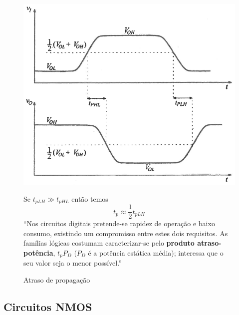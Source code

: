 \begin{figure}[H]
    \centering
    \begin{minipage}[t]{0.475\linewidth}\vspace{0pt}%
        \centering
        \includegraphics[width=1\linewidth]{img/5/propagation-delay.png}
        \caption{Atraso de propagação \cite{medeiros:CTBM}}
        \label{fig:propagation-delay}
    \end{minipage}\hfill%
    \begin{minipage}[t]{0.475\linewidth}\vspace{0pt}%
        Se $t_{pLH} \gg t_{pHL}$ então temos
        $$
            t_p \approx \frac{1}{2} t_{pLH}
        $$
        ``Nos circuitos digitais pretende-se rapidez de operação e baixo consumo, existindo um compromisso entre estes dois requisitos. As famílias lógicas costumam caracterizar-se pelo \textbf{produto atraso-potência}, $t_p P_D$ ($P_D$ é a potência estática média); interessa que o seu valor seja o menor possível.''\cite{medeiros:CTBM}
    \end{minipage}
\end{figure}

\subsection[5.3 Circuitos NMOS]{\hspace*{0.075 em}\raisebox{0.2 em}{$\pmb{\drsh}$} Circuitos NMOS}



